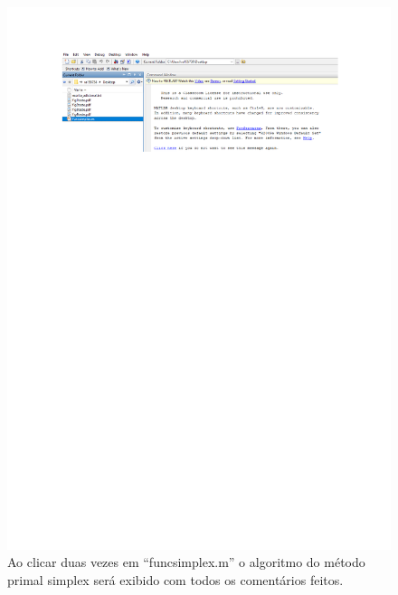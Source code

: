 \documentclass[10pt]{article}
\begin{document}
\begin{figure}[H]
    \centering
    \includegraphics[scale = 0.7]{fig5teste.pdf}
    \caption{Ao clicar duas vezes em ``funcsimplex.m'' o algoritmo do método primal simplex será exibido com todos os comentários feitos.}
\end{figure}
\end{document}
